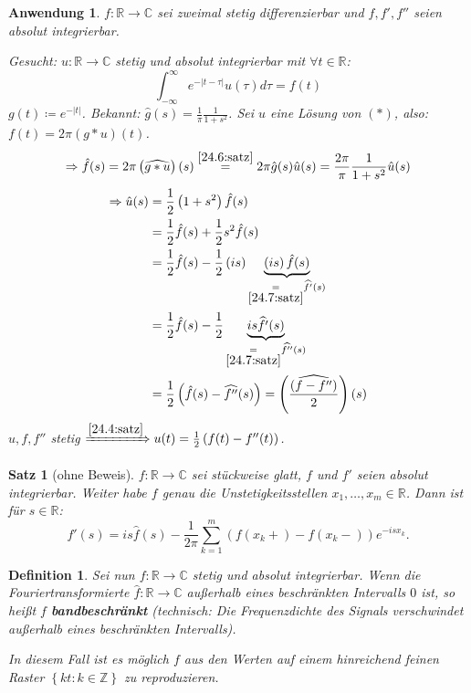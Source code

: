 \documentclass[12pt]{extreport} %
\newcommand{\C}{\mathbb{C}}
\newcommand{\R}{\mathbb{R}}
\newcommand{\Z}{\mathbb{Z}}
\theoremstyle{named}
\theoremstyle{nnamed}
\theoremstyle{itshape}
\newtheorem{satz}[unnamedtheorem]{Satz}
\newtheorem*{definition}{Definition}
\theoremstyle{normal}
\newtheorem*{anwendung*}{Anwendung}
\begin{document}
\begin{anwendung*}
	$f \colon \R \rightarrow \C$ sei zweimal stetig differenzierbar und $f, f', f''$ seien absolut integrierbar.
	
	\bigskip
	
	Gesucht: $u \colon \R \rightarrow \C$ stetig und absolut integrierbar mit $\forall t \in \R$:
	\begin{equation}
		\int_{-\infty}^{\infty} e^{-|t - \tau|} u(\tau) d\tau = f(t) \tag*{$(*)$}
	\end{equation}
	$g(t) \coloneqq e^{-|t|}$. Bekannt: $\hat{g}(s) = \frac{1}{\pi} \frac{1}{1+s^{2}}$. Sei $u$ eine Lösung von $(*)$, also: $f(t) = 2\pi \left( g \ast u \right) (t)$.
	$$ \Rightarrow \hat{f}(s) = 2\pi \left(\widehat{ g \ast u }\right)(s) \overset{\ref{24.6:satz}}{=} 2\pi \hat{g}(s) \hat{u}(s) = \frac{2\pi}{\pi} \frac{1}{1+s^{2}} \hat{u}(s) $$
	\begin{align*}
		\Rightarrow \hat{u}(s) & = \frac{1}{2} \left( 1 + s^{2} \right) \hat{f}(s) \\
		& = \frac{1}{2} \hat{f}(s) + \frac{1}{2} s^{2} \hat{f}(s) \\
		& = \frac{1}{2} \hat{f}(s) - \frac{1}{2} \left( is \right) \underbrace{\left( is \right) \hat{f}(s)}_{\underset{\ref{24.7:satz}}{=} \widehat{f'}(s)} \\
		& = \frac{1}{2} \hat{f}(s) - \frac{1}{2} \underbrace{is \widehat{f'}(s)}_{\underset{\ref{24.7:satz}}{=} \widehat{f''}(s)} \\
		& = \frac{1}{2} \left( \hat{f}(s) - \widehat{f''}(s) \right) = \left( \widehat{ \frac{\left( f - f'' \right)}{2}}  \right) (s) 
	\end{align*}
	$u,f,f''$ stetig $\xRightarrow[]{\ref{24.4:satz}} u(t) = \frac{1}{2} \left( f(t) - f''(t) \right)$.
\end{anwendung*}


\begin{satz}[ohne Beweis] \label{24.8:satz}
	$f \colon \R \rightarrow \C$ sei stückweise glatt, $f$ und $f'$ seien absolut integrierbar. Weiter habe $f$ genau die Unstetigkeitsstellen $x_{1}, \dotsc, x_{m} \in \R$. Dann ist für $s \in \R$:
	$$ \widehat{f'}(s) = is \hat{f}(s) - \frac{1}{2\pi} \sum_{k=1}^{m} \left( f(x_{k}+) - f(x_{k}-) \right) e^{-isx_{k}}. $$
\end{satz}

\begin{definition}
	Sei nun $f \colon \R \rightarrow \C$ stetig und absolut integrierbar. Wenn die Fouriertransformierte $\hat{f} \colon \R \rightarrow \C$ au{\ss}erhalb eines beschränkten Intervalls $0$ ist, so hei{\ss}t $f$ \textbf{bandbeschränkt} (technisch: Die Frequenzdichte des Signals verschwindet außerhalb eines beschränkten Intervalls). 
	
	\bigskip
	
	In diesem Fall ist es möglich $f$ aus den Werten auf einem hinreichend feinen Raster $\left\{ kt : k \in \Z \right\}$ zu reproduzieren.
\end{definition}
\end{document}
